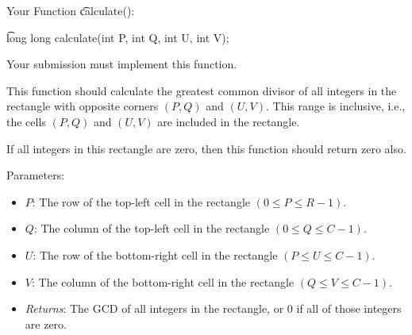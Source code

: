 Your Function \t{calculate()}:

\t{long long calculate(int P, int Q, int U, int V);}

Your submission must implement this function.

This function should calculate the greatest common divisor of all integers in the rectangle with opposite corners $(P, Q)$ and $(U, V)$. This range is inclusive, i.e., the cells $(P, Q)$ and $(U, V)$ are included in the rectangle.

If all integers in this rectangle are zero, then this function should return zero also.

Parameters:
\begin{itemize}
\item $P$: The row of the top-left cell in the rectangle $( 0 \leq P \leq R - 1)$.
\item $Q$: The column of the top-left cell in the rectangle $( 0 \leq Q \leq C - 1)$.
\item $U$: The row of the bottom-right cell in the rectangle $( P \leq U \leq C - 1)$.
\item $V$: The column of the bottom-right cell in the rectangle $( Q \leq V \leq C - 1)$.
\item \textit{Returns}: The GCD of all integers in the rectangle, or $0$ if all of those integers are zero.
\end{itemize}

